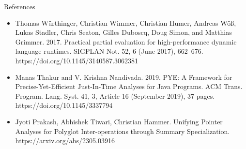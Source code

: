 
\begin{frame}{References}
    \begin{itemize}
        \item Thomas Würthinger, Christian Wimmer, Christian Humer, Andreas Wöß, Lukas Stadler, Chris Seaton, Gilles Duboscq, Doug Simon, and Matthias Grimmer. 2017. Practical partial evaluation for high-performance dynamic language runtimes. SIGPLAN Not. 52, 6 (June 2017), 662–676. https://doi.org/10.1145/3140587.3062381
        \vspace{2mm}
        \item Manas Thakur and V. Krishna Nandivada. 2019. PYE: A Framework for Precise-Yet-Efficient Just-In-Time Analyses for Java Programs. ACM Trans. Program. Lang. Syst. 41, 3, Article 16 (September 2019), 37 pages. https://doi.org/10.1145/3337794
        \vspace{2mm}
        \item Jyoti Prakash, Abhishek Tiwari, Christian Hammer. Unifying Pointer Analyses for Polyglot Inter-operations through Summary Specialization. https://arxiv.org/abs/2305.03916
    \end{itemize}
\end{frame}
